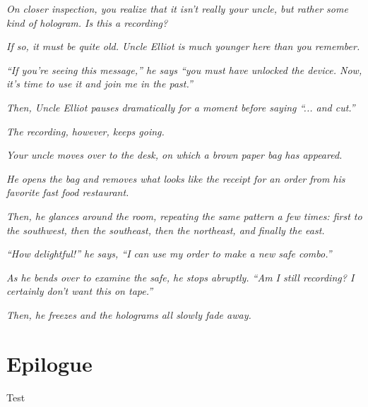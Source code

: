\documentclass[a6paper, parskip=half, DIV=14, 12pt]{scrartcl}
\begin{document}
\textit{On closer inspection, you realize that it isn't really your uncle, but rather some kind of hologram. Is this a recording?}

\textit{If so, it must be quite old. Uncle Elliot is much younger here than you remember.}

\textit{``If you're seeing this message,'' he says ``you must have unlocked the device. Now, it's time to use it and join me in the past.''}

\textit{Then, Uncle Elliot pauses dramatically for a moment before saying ``... and cut.''}

\newpage

\textit{The recording, however, keeps going.}

\textit{Your uncle moves over to the desk, on which a brown paper bag has appeared.}

\textit{He opens the bag and removes what looks like the receipt for an order from his favorite fast food restaurant.}

\textit{Then, he glances around the room, repeating the same pattern a few times: first to the southwest, then the southeast, then the northeast, and finally the east.}

\textit{``How delightful!'' he says, ``I can use my order to make a new safe combo.''}

\textit{As he bends over to examine the safe, he stops abruptly. ``Am I still recording? I certainly don't want this on tape.''}

\textit{Then, he freezes and the holograms all slowly fade away.}

\section*{Epilogue}
Test

%
%
%
%
%
%
%
%
%
%
%
%
%
%
%
%
%
%
%
%
\end{document}
